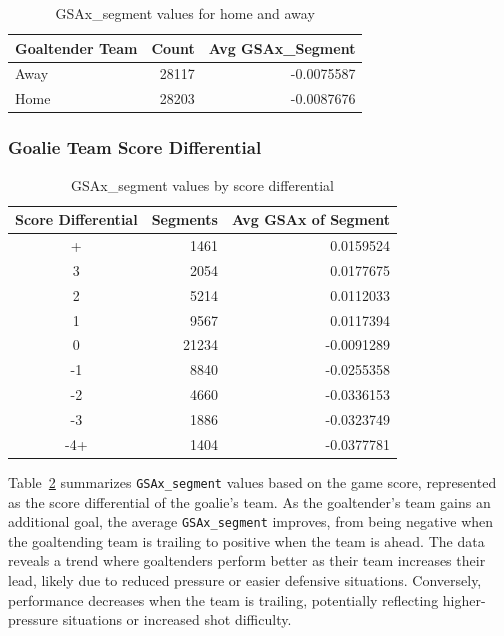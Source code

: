 \documentclass[
  letterpaper,
  DIV=11,
  numbers=noendperiod]{scrartcl}
\begin{document}
\begin{longtable}[]{@{}lrr@{}}

\caption{\label{tbl-homeaway}GSAx\_segment values for home and away}

\tabularnewline

\toprule\noalign{}
Goaltender Team & Count & Avg GSAx\_Segment \\
\midrule\noalign{}
\endhead
\bottomrule\noalign{}
\endlastfoot
Away & 28117 & -0.0075587 \\
Home & 28203 & -0.0087676 \\

\end{longtable}

\subsubsection{Goalie Team Score
Differential}\label{goalie-team-score-differential}

\begin{longtable}[]{@{}crr@{}}

\caption{\label{tbl-scorediff}GSAx\_segment values by score
differential}

\tabularnewline

\toprule\noalign{}
Score Differential & Segments & Avg GSAx of Segment \\
\midrule\noalign{}
\endhead
\bottomrule\noalign{}
\endlastfoot
4+ & 1461 & 0.0159524 \\
3 & 2054 & 0.0177675 \\
2 & 5214 & 0.0112033 \\
1 & 9567 & 0.0117394 \\
0 & 21234 & -0.0091289 \\
-1 & 8840 & -0.0255358 \\
-2 & 4660 & -0.0336153 \\
-3 & 1886 & -0.0323749 \\
-4+ & 1404 & -0.0377781 \\

\end{longtable}

Table~\ref{tbl-scorediff} summarizes \texttt{GSAx\_segment} values based
on the game score, represented as the score differential of the goalie's
team. As the goaltender's team gains an additional goal, the average
\texttt{GSAx\_segment} improves, from being negative when the
goaltending team is trailing to positive when the team is ahead. The
data reveals a trend where goaltenders perform better as their team
increases their lead, likely due to reduced pressure or easier defensive
situations. Conversely, performance decreases when the team is trailing,
potentially reflecting higher-pressure situations or increased shot
difficulty.
\end{document}
